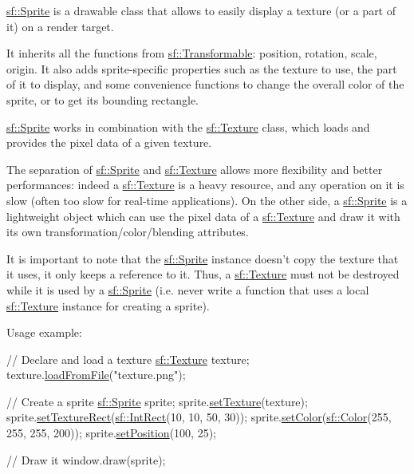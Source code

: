 \hyperlink{classsf_1_1Sprite}{sf\-::\-Sprite} is a drawable class that allows to easily display a texture (or a part of it) on a render target.

It inherits all the functions from \hyperlink{classsf_1_1Transformable}{sf\-::\-Transformable}\-: position, rotation, scale, origin. It also adds sprite-\/specific properties such as the texture to use, the part of it to display, and some convenience functions to change the overall color of the sprite, or to get its bounding rectangle.

\hyperlink{classsf_1_1Sprite}{sf\-::\-Sprite} works in combination with the \hyperlink{classsf_1_1Texture}{sf\-::\-Texture} class, which loads and provides the pixel data of a given texture.

The separation of \hyperlink{classsf_1_1Sprite}{sf\-::\-Sprite} and \hyperlink{classsf_1_1Texture}{sf\-::\-Texture} allows more flexibility and better performances\-: indeed a \hyperlink{classsf_1_1Texture}{sf\-::\-Texture} is a heavy resource, and any operation on it is slow (often too slow for real-\/time applications). On the other side, a \hyperlink{classsf_1_1Sprite}{sf\-::\-Sprite} is a lightweight object which can use the pixel data of a \hyperlink{classsf_1_1Texture}{sf\-::\-Texture} and draw it with its own transformation/color/blending attributes.

It is important to note that the \hyperlink{classsf_1_1Sprite}{sf\-::\-Sprite} instance doesn't copy the texture that it uses, it only keeps a reference to it. Thus, a \hyperlink{classsf_1_1Texture}{sf\-::\-Texture} must not be destroyed while it is used by a \hyperlink{classsf_1_1Sprite}{sf\-::\-Sprite} (i.\-e. never write a function that uses a local \hyperlink{classsf_1_1Texture}{sf\-::\-Texture} instance for creating a sprite).

Usage example\-: 
\begin{DoxyCode}
\textcolor{comment}{// Declare and load a texture}
\hyperlink{classsf_1_1Texture}{sf::Texture} texture;
texture.\hyperlink{classsf_1_1Texture_a8e1b56eabfe33e2e0e1cb03712c7fcc7}{loadFromFile}(\textcolor{stringliteral}{"texture.png"});

\textcolor{comment}{// Create a sprite}
\hyperlink{classsf_1_1Sprite}{sf::Sprite} sprite;
sprite.\hyperlink{classsf_1_1Sprite_a3729c88d88ac38c19317c18e87242560}{setTexture}(texture);
sprite.\hyperlink{classsf_1_1Sprite_a3fefec419a4e6a90c0fd54c793d82ec2}{setTextureRect}(\hyperlink{classsf_1_1Rect}{sf::IntRect}(10, 10, 50, 30));
sprite.\hyperlink{classsf_1_1Sprite_a14def44da6437bfea20c4df5e71aba4c}{setColor}(\hyperlink{classsf_1_1Color}{sf::Color}(255, 255, 255, 200));
sprite.\hyperlink{classsf_1_1Transformable_a4dbfb1a7c80688b0b4c477d706550208}{setPosition}(100, 25);

\textcolor{comment}{// Draw it}
window.draw(sprite);
\end{DoxyCode}


